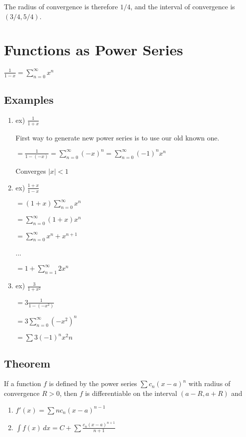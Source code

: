 \documentclass{article}
\begin{document}
    The radius of convergence is therefore $1/4$, and the interval of convergence is $(3/4, 5/4)$.
    
\section{Functions as Power Series}
$\frac{1}{1-x} = \sum_{n=0}^{\infty} x^n$
\subsection{Examples}

\begin{enumerate}
    \item ex) $\frac{1}{1+x}$
    
    First way to generate new power series is to use our old known one.
    
    $ = \frac{1}{1-(-x)} = \sum_{n=0}^{\infty} (-x)^n = \sum_{n=0}^{\infty} (-1)^n x^n$
    
    Converges $|x|<1$
    
    \item ex) $\frac{1+x}{1-x}$
    
    $ = (1+x) \sum_{n=0}^{\infty} x^n$ 
    
    $= \sum_{n=0}^{\infty} (1+x) x^n $
    
    $= \sum_{n=0}^{\infty} x^n+x^{n+1}$
    
    ...
    
    $= 1+\sum_{n=1}^{\infty}2x^n$
    
    \item ex) $\frac{3}{1+x^2}$
    
    $=3\frac{1}{1-(-x^2)}$ 
    
    $=3\sum_{n=0}^{\infty} (-x^2)^n$
    
    $=\sum3(-1)^n x^2n$
\end{enumerate}

\subsection{Theorem}

If a function $f$ is defined by the power series $\sum c_n(x-a)^n$ with radius of convergence $R>0$, then $f$ is differentiable on the interval $(a-R, a+R)$ and 
\begin{enumerate}
    \item $f'(x) = \sum n c_n (x-a)^{n-1}$
    \item $\int f(x) \,dx = C + \sum \frac{c_n (x-a)^{n+1}}{n+1}$
\end{enumerate}
\end{document}
